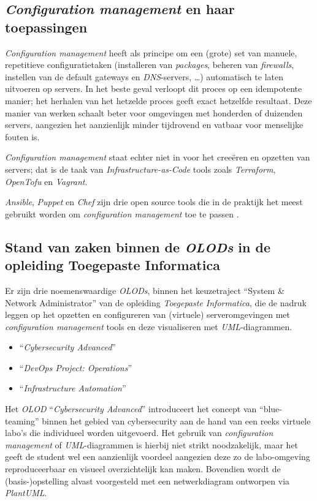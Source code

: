 \subsection{\emph{Configuration management} en haar toepassingen}%
\label{subsec:voorstel_cfgmgmt_toepassingen}

\emph{Configuration management} heeft als principe om een (grote) set van manuele, repetitieve configuratietaken (installeren van \emph{packages}, beheren van \emph{firewalls}, instellen van de default gateways en \emph{DNS}-servers, \ldots) automatisch te laten uitvoeren op servers. In het beste geval verloopt dit proces op een idempotente manier; het herhalen van het hetzelde proces geeft exact hetzelfde resultaat. Deze manier van werken schaalt beter voor omgevingen met honderden of duizenden servers, aangezien het aanzienlijk minder tijdrovend en vatbaar voor menselijke fouten is. \autocite{Likitha2022}

\emph{Configuration management} staat echter niet in voor het creeëren en opzetten van servers; dat is de taak van \emph{Infrastructure-as-Code} tools zoals \emph{Terraform}, \emph{OpenTofu} en \emph{Vagrant}.

\emph{Ansible}, \emph{Puppet} en \emph{Chef} zijn drie open source tools die in de praktijk het meest gebruikt worden om \emph{configuration management} toe te passen \autocite{Masek2018}.

\subsection{Stand van zaken binnen de \emph{OLODs} in de opleiding Toegepaste Informatica}%
\label{subsec:voorstel_stand_van_zaken_binnen_olods_ti}

Er zijn drie noemenswaardige \emph{OLODs}, binnen het keuzetraject ``System \& Network Administrator'' van de opleiding \emph{Toegepaste Informatica}, die de nadruk leggen op het opzetten en configureren van (virtuele) serveromgevingen met \emph{configuration management} tools en deze visualiseren met \emph{UML}-diagrammen.

\begin{itemize}
  \item ``\emph{Cybersecurity Advanced}''
  \item ``\emph{DevOps Project: Operations}''
  \item ``\emph{Infrastructure Automation}''
\end{itemize}

Het \emph{OLOD} ``\emph{Cybersecurity Advanced}'' introduceert het concept van ``blue-teaming'' binnen het gebied van cybersecurity aan de hand van een reeks virtuele labo's die individueel worden uitgevoerd. Het gebruik van \emph{configuration management} of \emph{UML}-diagrammen is hierbij niet strikt noodzakelijk, maar het geeft de student wel een aanzienlijk voordeel aangezien deze zo de labo-omgeving reproduceerbaar en visueel overzichtelijk kan maken. Bovendien wordt de (basis-)opstelling alvast voorgesteld met een netwerkdiagram ontworpen via \emph{PlantUML}.

